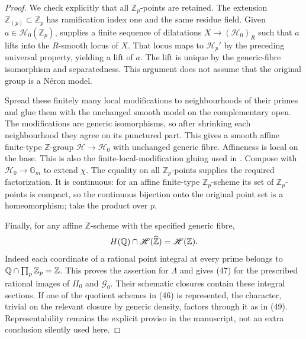 \begin{proof}
We check explicitly that all $\mathbb Z_p$-points are retained.
The extension $\mathbb Z_{(p)}\subset\mathbb Z_p$ has
ramification index one and the same residue field.
Given $a\in\mathscr H_0(\mathbb Z_p)$,
\citet[\S3.6, Proposition 4, p.~79]{DS_BLR1990} supplies
a finite sequence of dilatations $X\to(\mathscr H_0)_R$
such that $a$ lifts into the $R$-smooth locus of $X$.
That locus maps to $\mathscr H_p'$ by the preceding universal
property, yielding a lift of $a$. The lift is unique by the
generic-fibre isomorphism and separatedness. This argument
does not assume that the original group is a N\'eron model.

Spread these finitely many local modifications to neighbourhoods
of their primes and glue them with the unchanged smooth model
on the complementary open. The modifications are generic
isomorphisms, so after shrinking each neighbourhood they agree
on its punctured part. This gives a smooth affine finite-type
$\mathbb Z$-group $\mathscr H\to\mathscr H_0$ with unchanged
generic fibre. Affineness is local on the base. This is also
the finite-local-modification gluing used in
\citet[proof of \S7.1, Corollary 6, p.~175]{DS_BLR1990}.
Compose with $\mathscr H_0\to\mathbb G_m$ to extend $\chi$.
The equality on all $\mathbb Z_p$-points supplies the required
factorization. It is continuous: for an affine finite-type
$\mathbb Z_p$-scheme its set of $\mathbb Z_p$-points is compact,
so the continuous bijection onto the original point set is a
homeomorphism; take the product over $p$.

Finally, for any affine $\mathbb Z$-scheme with the specified
generic fibre,
\[
             H(\mathbb Q)\cap\mathscr H(\widehat{\mathbb Z})
                         =\mathscr H(\mathbb Z).
\]
Indeed each coordinate of a rational point integral at every
prime belongs to $\mathbb Q\cap\prod_p\mathbb Z_p=\mathbb Z$.
This proves the assertion for $\Lambda$ and gives (47) for
the prescribed rational images of $\Pi_0$ and $\mathcal G_0$.
Their schematic closures contain these integral sections. If
one of the quotient schemes in (46) is represented, the
character, trivial on the relevant closure by generic density,
factors through it as in (49). Representability remains the
explicit proviso in the manuscript, not an extra conclusion
silently used here.
\end{proof}

